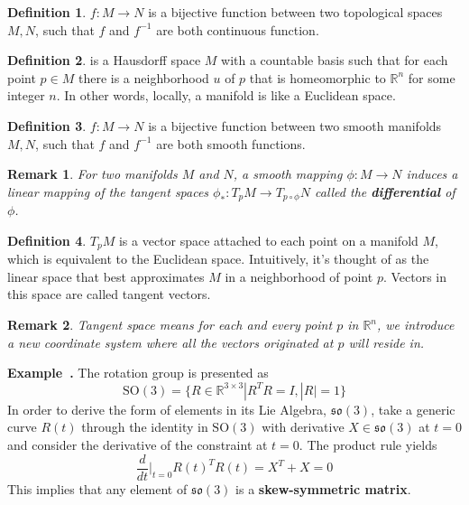 \documentclass[a4paper]{article}
\theoremstyle{definition}
\newtheorem{definition}{Definition}
\theoremstyle{plain}
\newtheorem{remark}{Remark}
\newcounter{example}{Example}
\newenvironment{example}[1][]{\refstepcounter{example}\par\medskip
   \noindent \textbf{Example~\theexample. #1} \rmfamily}{\medskip}
\begin{document}
\begin{definition}\label{def:homeomorphism}
 $f:M\rightarrow N$ is a bijective function between two topological spaces $M,N$, such that $f$ and $f^{-1}$ are both continuous function.
\end{definition}

\begin{definition}
 is a Hausdorff space $M$ with a countable basis such that for each point $p\in M$ there is a neighborhood $u$ of $p$ that is homeomorphic to $\mathbb{R}^n$ for some integer $n$. In other words, locally, a manifold is like a Euclidean space.
\end{definition}

\begin{definition}\label{def:diffeomorphism}
 $f:M\rightarrow N$ is a bijective function between two smooth manifolds $M, N$, such that $f$ and $f^{-1}$ are both smooth functions.
\end{definition}

\begin{remark}
For two manifolds $M$ and $N$, a smooth mapping $\phi:M\rightarrow N$ induces a linear mapping of the tangent spaces $\phi_*:T_pM\rightarrow T_{p\circ\phi}N$ called the \textbf{differential} of $\phi$.
\end{remark}

\begin{definition}
 $T_pM$ is a vector space attached to each point on a manifold $M$, which is equivalent to the Euclidean space. Intuitively, it's thought of as the linear space that best approximates $M$ in a neighborhood of point $p$. Vectors in this space are called tangent vectors.
\end{definition}

\begin{remark}
Tangent space means for each and every point $p$ in $\mathbb{R}^n$, we introduce a new coordinate system where all the vectors originated at $p$ will reside in.
\end{remark}

\begin{example}
The rotation group is presented as
\begin{equation*}
    \mathrm{SO}(3)=\{R\in \mathbb{R}^{3×3}|R^TR=I,|R|=1\}
\end{equation*}
In order to derive the form of elements in its Lie Algebra, $\mathfrak{so}(3)$, take a generic curve $R(t)$ through the identity in $\mathrm{SO}(3)$ with derivative $X\in\mathfrak{so}(3)$ at $t=0$ and consider the derivative of the constraint at $t=0$. The product rule yields
\begin{equation*}
    \frac{d}{dt}\bigg\rvert_{t=0}R(t)^TR(t)=X^T+X=0
\end{equation*}
This implies that any element of $\mathfrak{so}(3)$ is a \textbf{skew-symmetric matrix}.
\end{example}
\end{document}

